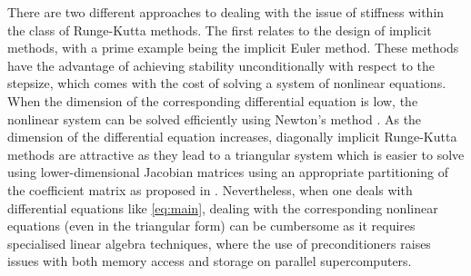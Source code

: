 \documentclass[10pt,a4paper]{article}
\begin{document}
There are two different approaches to dealing with the issue of stiffness within the class of Runge-Kutta methods. The first relates to the design of implicit methods, with a prime example being the implicit Euler method. These methods have the %
{advantage of achieving stability unconditionally with respect to the stepsize,} 
which comes with the cost of solving a system of nonlinear equations.  When the dimension of the corresponding differential equation is low, the nonlinear system can be solved {efficiently using Newton's method \cite{NW06}}. As the dimension of the differential equation increases, diagonally implicit Runge-Kutta methods are attractive as they lead to a triangular system which is easier to solve using lower-dimensional Jacobian matrices using an appropriate partitioning of the coefficient matrix as proposed in \cite{VSC92}. Nevertheless, when one deals with differential equations like \eqref{eq:main}, dealing with the corresponding nonlinear equations (even in the triangular form) can be cumbersome as it requires specialised linear algebra techniques, {where the use of preconditioners raises issues with both memory access and storage on parallel supercomputers.} 
\end{document}
